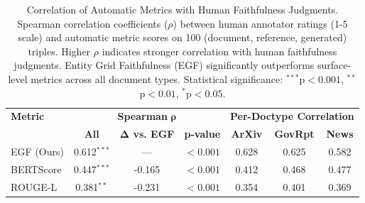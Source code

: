 
\begin{table}[t]
\centering
\caption{Correlation of Automatic Metrics with Human Faithfulness Judgments.
Spearman correlation coefficients ($\rho$) between human annotator ratings (1-5 scale) and automatic metric scores on 100 (document, reference, generated) triples. Higher $\rho$ indicates stronger correlation with human faithfulness judgments. Entity Grid Faithfulness (EGF) significantly outperforms surface-level metrics across all document types. Statistical significance: $^{***}$p$<0.001$, $^{**}$p$<0.01$, $^{*}$p$<0.05$.}
\label{table:egf_validation}
\small
\begin{tabular}{l|ccc|ccc}
\toprule
\textbf{Metric} & \multicolumn{3}{c|}{\textbf{Spearman } $\boldsymbol{\rho}$} & \multicolumn{3}{c}{\textbf{Per-Doctype Correlation}} \\
& \textbf{All} & \textbf{Δ vs. EGF} & \textbf{p-value} & \textbf{ArXiv} & \textbf{GovRpt} & \textbf{News} \\
\midrule
EGF (Ours) & 0.612$^{***}$ & --- & $<0.001$ & 0.628 & 0.625 & 0.582 \\
BERTScore & 0.447$^{***}$ & -0.165 & $<0.001$ & 0.412 & 0.468 & 0.477 \\
ROUGE-L & 0.381$^{**}$ & -0.231 & $<0.001$ & 0.354 & 0.401 & 0.369 \\
\bottomrule
\end{tabular}
\end{table}


